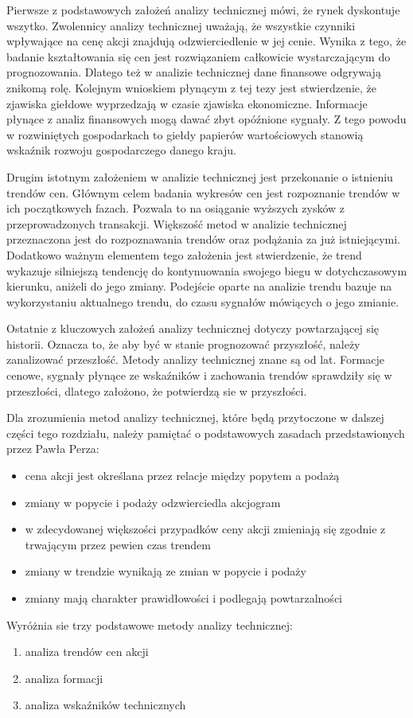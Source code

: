 \documentclass[pdflatex,11pt]{aghdpl}
\begin{document}
Pierwsze z podstawowych założeń analizy technicznej mówi, że rynek dyskontuje wszytko. Zwolennicy analizy technicznej uważają, że wszystkie czynniki wpływające na cenę akcji znajdują odzwierciedlenie w jej cenie\cite{5}. Wynika z tego, że badanie kształtowania się cen jest rozwiązaniem całkowicie wystarczającym do prognozowania. Dlatego też w analizie technicznej dane finansowe odgrywają znikomą rolę. Kolejnym wnioskiem płynącym z tej tezy jest stwierdzenie, że zjawiska giełdowe wyprzedzają w czasie zjawiska ekonomiczne. Informacje płynące z analiz finansowych mogą dawać zbyt opóźnione sygnały. Z tego powodu w rozwiniętych gospodarkach to giełdy papierów wartościowych stanowią wskaźnik rozwoju gospodarczego danego kraju.

Drugim istotnym założeniem w analizie technicznej jest przekonanie o istnieniu trendów cen. Głównym celem badania wykresów cen jest rozpoznanie trendów w ich początkowych fazach. Pozwala to na osiąganie wyższych zysków z przeprowadzonych transakcji. Większość metod w analizie technicznej przeznaczona jest do rozpoznawania trendów oraz podążania za już istniejącymi. Dodatkowo ważnym elementem tego założenia jest stwierdzenie, że trend wykazuje silniejszą tendencję do kontynuowania swojego biegu w dotychczasowym kierunku, aniżeli do jego zmiany\cite{5}. Podejście oparte na analizie trendu bazuje na wykorzystaniu aktualnego trendu, do czasu sygnałów mówiących o jego zmianie.

Ostatnie z kluczowych założeń analizy technicznej dotyczy powtarzającej się historii. Oznacza to, że aby być w stanie prognozować przyszłość, należy zanalizować przeszłość. Metody analizy technicznej znane są od lat. Formacje cenowe, sygnały płynące ze wskaźników i zachowania trendów sprawdziły się w przeszłości, dlatego założono, że potwierdzą sie w przyszłości\cite{5}. 

Dla zrozumienia metod analizy technicznej, które będą przytoczone w dalszej części tego rozdziału, należy pamiętać o podstawowych zasadach przedstawionych przez Pawła Perza:
\begin{itemize}
\item cena akcji jest określana przez relacje między popytem a podażą
\item zmiany w popycie i podaży odzwierciedla akcjogram
\item w zdecydowanej większości przypadków ceny akcji zmieniają się zgodnie z trwającym przez pewien czas trendem
\item zmiany w trendzie wynikają ze zmian w popycie i podaży
\item zmiany mają charakter prawidłowości i podlegają powtarzalności 
\end{itemize}
Wyróżnia sie trzy podstawowe metody analizy technicznej:
\begin{enumerate}
\item analiza trendów cen akcji
\item analiza formacji
\item analiza wskaźników technicznych
\end{enumerate}
\end{document}
